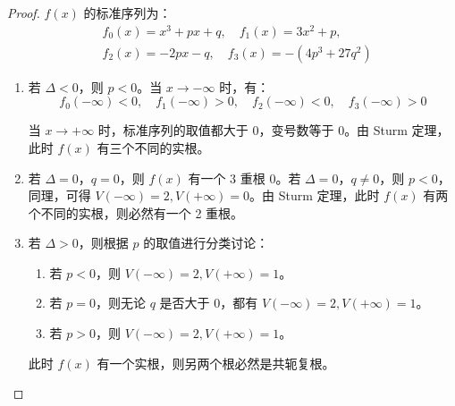 \begin{proof}
	$f(x)$ 的标准序列为：
	$$
	\begin{aligned}
		&f_0(x) = x^3 + px + q, \quad f_1(x) = 3x^2 + p,
		\\
		&f_2(x) = -2px - q, \quad f_3(x) = -(4p^3 + 27 q^2)
	\end{aligned}
	$$

	\begin{enumerate}
		\item 若 $\Delta < 0$，则 $p < 0$。当 $x \to -\infty$ 时，有：
		$$
		f_0(-\infty) < 0, \quad f_1(-\infty) > 0, \quad f_2(-\infty) < 0, \quad f_3(-\infty) > 0
		$$

		当 $x \to +\infty$ 时，标准序列的取值都大于 $0$，变号数等于 $0$。由 Sturm 定理，此时 $f(x)$ 有三个不同的实根。

		\item 若 $\Delta = 0$，$q = 0$，则 $f(x)$ 有一个 3 重根 $0$。若 $\Delta = 0$，$q \ne 0$，则 $p < 0$，同理，可得 $V(-\infty) = 2, V(+\infty) = 0$。由 Sturm 定理，此时 $f(x)$ 有两个不同的实根，则必然有一个 2 重根。

		\item 若 $\Delta > 0$，则根据 $p$ 的取值进行分类讨论：
		\begin{enumerate}
			\item 若 $p < 0$，则 $V(-\infty) = 2, V(+\infty) = 1$。
			\item 若 $p = 0$，则无论 $q$ 是否大于 $0$，都有 $V(-\infty) = 2, V(+\infty) = 1$。
			\item 若 $p > 0$，则 $V(-\infty) = 2, V(+\infty) = 1$。
		\end{enumerate}

		此时 $f(x)$ 有一个实根，则另两个根必然是共轭复根。
	\end{enumerate}
\end{proof}


